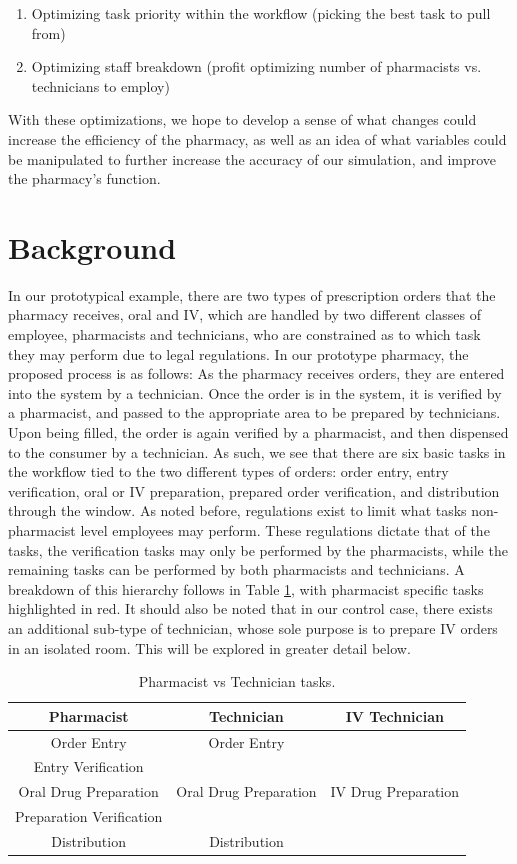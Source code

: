 \documentclass[10pt]{report}            %
\begin{document}
\begin{enumerate}
\item Optimizing task priority within the workflow (picking the best task to pull from)
\item Optimizing staff breakdown (profit optimizing number of pharmacists vs. technicians to employ)
\end{enumerate}
With these optimizations, we hope to develop a sense of what changes could increase the efficiency of the pharmacy, as well as an idea of what variables could be manipulated to further increase the accuracy of our simulation, and improve the pharmacy's function.
\section*{Background}
In our prototypical example, there are two types of prescription orders that the pharmacy receives, oral and IV, which are handled by two different classes of employee, pharmacists and technicians, who are constrained as to which task they may perform due to legal regulations. In our prototype pharmacy, the proposed process is as follows: As the pharmacy receives orders, they are entered into the system by a technician. Once the order is in the system, it is verified by a pharmacist, and passed to the appropriate area to be prepared by technicians. Upon being filled, the order is again verified by a pharmacist, and then dispensed to the consumer by a technician. As such, we see that there are six basic tasks in the workflow tied to the two different types of orders: order entry, entry verification, oral or IV preparation, prepared order verification, and distribution through the window. As noted before, regulations exist to limit what tasks non-pharmacist level employees may perform. These regulations dictate that of the tasks, the verification tasks may only be performed by the pharmacists, while the remaining tasks can be performed by both pharmacists and technicians. A breakdown of this hierarchy follows in Table \ref{table:tasks}, with pharmacist specific tasks highlighted in red. It should also be noted that in our control case, there exists an additional sub-type of technician, whose sole purpose is to prepare IV orders in an isolated room. This will be explored in greater detail below.
\begin{table}[H]
\centering
\begin{tabular}{|c||c|c|}
\hline
Pharmacist & Technician & IV Technician\\\hline\hline
Order Entry & Order Entry &\\\hline
\cellcolor{red!25}Entry Verification && \\\hline
Oral Drug Preparation & Oral Drug Preparation & \cellcolor{blue!25}IV Drug Preparation\\\hline
\cellcolor{red!25}Preparation Verification &&\\\hline
Distribution & Distribution&\\\hline
\end{tabular}
\caption{Pharmacist vs Technician tasks.}
\label{table:tasks}
\end{table}
\end{document}
